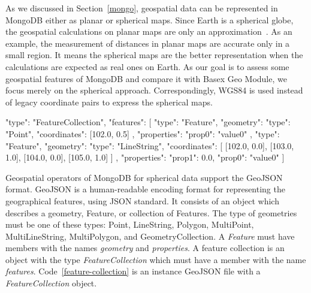 \documentclass[a4paper,12pt]{article}
\begin{document}
As we discussed in Section~\ref{mongo}, geospatial data can be represented in MongoDB either as planar or spherical maps. Since Earth is a spherical globe, the geospatial calculations on planar maps are only an approximation~\cite{coordsys,coordsys-mongo}. As an example, the measurement of distances in planar maps are accurate only in a small region. It means the spherical maps are the better representation when the calculations are expected as real ones on Earth. As our goal is to assess some geospatial features of MongoDB and compare it with Basex Geo Module, we focus merely on the spherical approach. Correspondingly, WGS84 is used instead of legacy coordinate pairs to express the spherical maps. 

\vspace{10px}
\begin{fakeXML}[label=feature-collection,caption=A GeoJSON file containing a \textit{FeatureCollection} object]
{
  "type": "FeatureCollection",
  "features": [
    {
      "type": "Feature",
      "geometry": {
        "type": "Point",
        "coordinates": [102.0, 0.5]
      },
      "properties": {
        "prop0": "value0"
      }
    },
    {
      "type": "Feature",
      "geometry": {
        "type": "LineString",
        "coordinates": [
          [102.0, 0.0], [103.0, 1.0], [104.0, 0.0], [105.0, 1.0]
        ]
      },
      "properties": {
        "prop1": 0.0,
        "prop0": "value0"
      }
    }
  ]
}
\end{fakeXML}
\vspace{10px}


Geospatial operators of MongoDB for spherical data support the GeoJSON \cite{www/geojson} format. GeoJSON is a human-readable encoding format for representing the geographical features, using JSON standard. It consists of an object which describes a geometry, Feature, or collection of Features. The type of geometries must be one of these types: Point, LineString, Polygon, MultiPoint, MultiLineString, MultiPolygon, and GeometryCollection. A \textit{Feature} must have members with the names \textit{geometry} and \textit{properties}. A feature collection is an object with the type \textit{FeatureCollection} which must have a member with the name \textit{features}. Code~\ref{feature-collection} is an instance GeoJSON file with a \textit{FeatureCollection} object.
\end{document}
